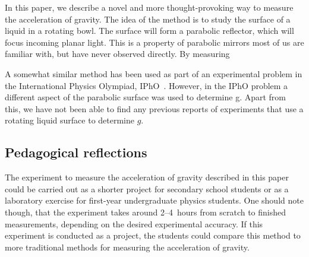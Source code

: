 \documentclass[11pt,
a4paper, 
swedish, english]{article}
\begin{document}
In this paper, we describe a novel and more thought-provoking way to
measure the acceleration of gravity. The idea of the method is to
study the surface of a liquid in a rotating bowl. The surface will
form a parabolic reflector, which will focus incoming planar
light. This is a property of parabolic mirrors most of us are familiar
with, but have never observed directly. By measuring 


A somewhat similar method has been used as part of an experimental
problem in the International Physics Olympiad,
IPhO~\cite{IPhO2001}. However, in the IPhO problem a 
different aspect of the parabolic surface was used
to determine g. Apart from this, we have not been able to find any
previous reports of experiments that use a rotating liquid surface to
determine $g$. 



\subsection{Pedagogical reflections}

The experiment to measure the acceleration of gravity described in
this paper could be carried out as a shorter project for secondary
school students or as a laboratory exercise for first-year
undergraduate physics students. One should note though, that the
experiment takes around 2--4~hours from scratch to finished
measurements, depending on the desired experimental accuracy. If this
experiment is conducted as a project, the students could compare this
method to more traditional methods for measuring the acceleration of
gravity. 
\end{document}
